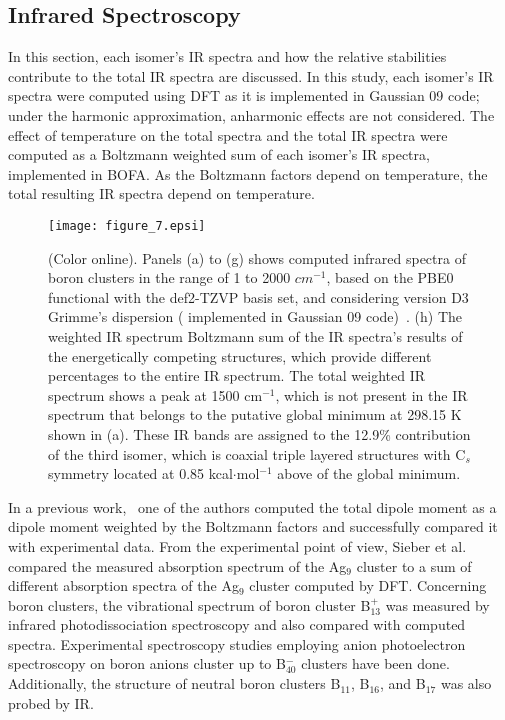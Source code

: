 \documentclass[prb,aps,preprint,showkeys,showpacs]{revtex4}
\begin{document}
\subsection{Infrared Spectroscopy}
In this section, each isomer’s IR spectra and how the relative stabilities contribute to the total IR spectra are discussed. In this study, each isomer’s IR spectra were computed using DFT as it is implemented in Gaussian 09 code; under the harmonic approximation, anharmonic effects are not considered. The effect of temperature on the total spectra and the total IR spectra were computed as a Boltzmann weighted sum of each isomer’s IR spectra, implemented in BOFA. As the Boltzmann factors depend on temperature, the total resulting IR spectra depend on temperature.
\begin{figure}[ht!]
  \begin{center}
  \texttt{[image: figure\_7.epsi]} 
  \caption{(Color online). Panels (a) to (g) shows computed infrared spectra of boron clusters  in the range of 1 to 2000 $cm^{-1}$, based on the PBE0 functional with the def2-TZVP basis set, and considering version D3 Grimme's dispersion ( implemented in Gaussian 09 code)~\cite{gauss}. (h) The weighted IR spectrum Boltzmann sum of the IR spectra's results of the energetically competing structures, which provide different percentages to the entire IR spectrum. The total weighted IR spectrum shows a peak at 1500 cm$^{-1}$, which is not present in the IR spectrum that belongs to the putative global minimum at 298.15 K shown in (a). These IR bands are assigned to the 12.9{\%} contribution of the third isomer, which is coaxial triple layered structures with C$_s$ symmetry located at 0.85 kcal$\cdot$mol$^{-1}$ above of the global minimum.}
  \label{irs}
  \end{center}
\end{figure}
In a previous work,~\cite{Vargas-Caamal} one of the authors computed the total dipole moment as a dipole moment weighted by the Boltzmann factors and successfully compared it with experimental data.  From the experimental point of view,   Sieber et al.~\cite{Felix} compared the measured absorption spectrum of the Ag$_9$ cluster to a sum of different absorption spectra of the Ag$_9$ cluster computed by DFT.    Concerning boron clusters,  the vibrational spectrum of boron cluster B$_{13}^+$  was measured by infrared photodissociation spectroscopy and also compared with computed spectra.  Experimental spectroscopy studies employing anion photoelectron spectroscopy on boron anions cluster up to B$_{40}^{-}$ clusters have been done.  Additionally, the structure of neutral boron clusters B$_{11}$, B$_{16}$, and B$_{17}$ was also probed by IR.
\end{document}
